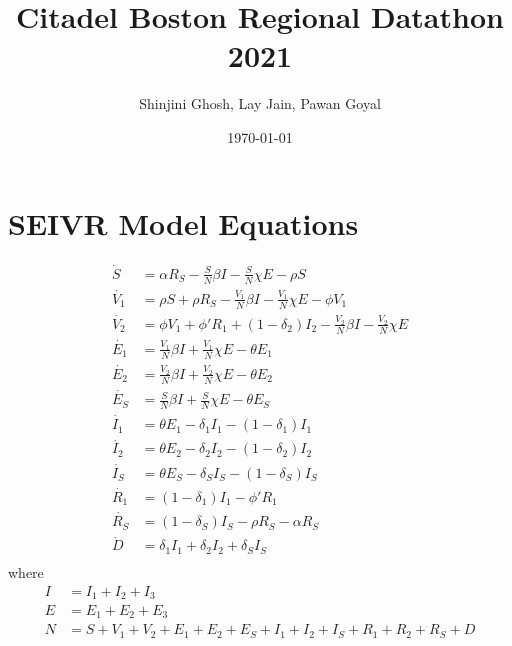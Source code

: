 \documentclass[12pt]{article}
\begin{document}
 

\title{Citadel Boston Regional Datathon 2021}
\author{Shinjini Ghosh, Lay Jain, Pawan Goyal}
\date{\today}
\maketitle


\section*{SEIVR Model Equations}
\begin{align*}
    \Dot{S} & = \alpha R_S - \frac{S}{N}\beta I- \frac{S}{N}\chi E-\rho S \\[4pt]
    \Dot{V_1} &= \rho S + \rho R_S - \frac{V_1}{N}\beta I - \frac{V_1}{N}\chi E - \phi V_1 \\[4pt]
    \Dot{V_2} &= \phi V_1 + \phi ' R_1 + (1-\delta_2)I_2 - \frac{V_2}{N} \beta I - \frac{V_2}{N} \chi E \\[4pt]
    \Dot{E_1} &= \frac{V_1}{N} \beta I + \frac{V_1}{N} \chi E - \theta E_1\\[4pt]
    \Dot{E_2} &= \frac{V_2}{N} \beta I + \frac{V_2}{N} \chi E - \theta E_2 \\[4pt]
    \Dot{E_S} &= \frac{S}{N} \beta I + \frac{S}{N} \chi E - \theta E_S \\[4pt]
    \Dot{I_1} &= \theta E_1 - \delta_1 I_1 - (1-\delta_1) I_1 \\[4pt]
    \Dot{I_2} &= \theta E_2 - \delta_2 I_2 - (1-\delta_2) I_2 \\[4pt]
    \Dot{I_S} &= \theta E_S - \delta_S I_S - (1-\delta_S) I_S \\[4pt]
    \Dot{R_1} &= (1-\delta_1) I_1 - \phi ' R_1 \\[4pt]
    \Dot{R_S} &= (1-\delta_S) I_S - \rho R_S - \alpha R_S \\[4pt]
    \Dot{D} &= \delta_1 I_1 + \delta_2 I_2 + \delta_S I_S \\
\end{align*}
\vspace{-4mm}
where 
\vspace{-5mm}
\begin{align*}
    I &= I_1 + I_2 + I_3 \\
    E &= E_1 + E_2 + E_3 \\
    N &= S + V_1 + V_2 + E_1 + E_2 + E_S + I_1 + I_2 + I_S + R_1 + R_2 + R_S + D \\
\end{align*}
\end{document}
